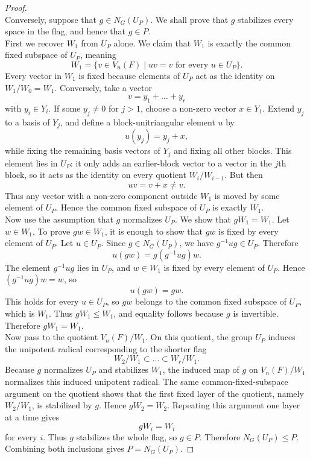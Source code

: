 \documentclass[../Odyssey_Project.tex]{subfiles}
\begin{document}
\begin{proof}
\[\]
Conversely, suppose that $g\in N_G(U_P)$. We shall prove that $g$ stabilizes every space in the flag, and hence that $g\in P$.\\
First we recover $W_1$ from $U_P$ alone. We claim that $W_1$ is exactly the common fixed subspace of $U_P$, meaning
\[
    W_1=\{v\in V_n(F)\mid uv=v \text{ for every }u\in U_P\}.
\]
Every vector in $W_1$ is fixed because elements of $U_P$ act as the identity on $W_1/W_0=W_1$. Conversely, take a vector
\[
    v=y_1+\dots+y_r
\]
with $y_i\in Y_i$. If some $y_j\neq0$ for $j>1$, choose a non-zero vector $x\in Y_1$. Extend $y_j$ to a basis of $Y_j$, and define a block-unitriangular element $u$ by
\[
    u(y_j)=y_j+x,
\]
while fixing the remaining basis vectors of $Y_j$ and fixing all other blocks. This element lies in $U_P$: it only adds an earlier-block vector to a vector in the $j$th block, so it acts as the identity on every quotient $W_i/W_{i-1}$. But then
\[
    uv=v+x\neq v.
\]
Thus any vector with a non-zero component outside $W_1$ is moved by some element of $U_P$. Hence the common fixed subspace of $U_P$ is exactly $W_1$.\\
Now use the assumption that $g$ normalizes $U_P$. We show that $gW_1=W_1$. Let $w\in W_1$. To prove $gw\in W_1$, it is enough to show that $gw$ is fixed by every element of $U_P$. Let $u\in U_P$. Since $g\in N_G(U_P)$, we have $g^{-1}ug\in U_P$. Therefore
\[
    u(gw)=g(g^{-1}ug)w.
\]
The element $g^{-1}ug$ lies in $U_P$, and $w\in W_1$ is fixed by every element of $U_P$. Hence $(g^{-1}ug)w=w$, so
\[
    u(gw)=gw.
\]
This holds for every $u\in U_P$, so $gw$ belongs to the common fixed subspace of $U_P$, which is $W_1$. Thus $gW_1\leq W_1$, and equality follows because $g$ is invertible. Therefore $gW_1=W_1$.\\
Now pass to the quotient $V_n(F)/W_1$. On this quotient, the group $U_P$ induces the unipotent radical corresponding to the shorter flag
\[
    W_2/W_1\subset \dots \subset W_r/W_1.
\]
Because $g$ normalizes $U_P$ and stabilizes $W_1$, the induced map of $g$ on $V_n(F)/W_1$ normalizes this induced unipotent radical. The same common-fixed-subspace argument on the quotient shows that the first fixed layer of the quotient, namely $W_2/W_1$, is stabilized by $g$. Hence $gW_2=W_2$. Repeating this argument one layer at a time gives
\[
    gW_i=W_i
\]
for every $i$. Thus $g$ stabilizes the whole flag, so $g\in P$. Therefore $N_G(U_P)\leq P$. Combining both inclusions gives $P=N_G(U_P)$.
\end{proof}
\end{document}
